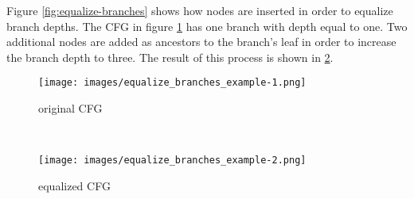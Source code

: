 Figure \ref{fig:equalize-branches} shows how nodes are inserted in order to equalize branch depths. The CFG in figure \ref{fig:equalize-branches-1} has one branch with depth equal to one. 
Two additional nodes are added as ancestors to the branch's leaf in order to increase the branch depth to three. The result of this process is shown in \ref{fig:equalize-branches-2}.


\begin{algorithm*}
    \SetAlgoLined
    \DontPrintSemicolon

    \caption{Equalize Branches}
    \label{alg:equalizeBranches}
\end{algorithm*}


\begin{figure*}[t!]
    \centering
    \begin{subfigure}[t]{0.5\textwidth}
        \centering
        \texttt{[image: images/equalize\_branches\_example-1.png]}
        \caption{original CFG}
        \label{fig:equalize-branches-1}
    \end{subfigure}%
    ~
    \begin{subfigure}[t]{0.5\textwidth}
        \centering
        \texttt{[image: images/equalize\_branches\_example-2.png]}
        \caption{equalized CFG}
        \label{fig:equalize-branches-2}
    \end{subfigure}
    \caption{Equalizing branch depths}
    \label{fig:equalize-branches}
\end{figure*}


